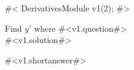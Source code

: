 

#<
DerivativesModule v1(2);
#>

Find $y'$ where #<v1.question#> \\


#<v1.solution#>

#<v1.shortanswer#>


